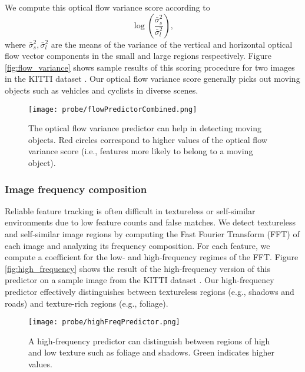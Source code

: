 We compute this optical flow variance score according to
\begin{equation}
    \log \left( \frac{\bar{\sigma}^2_s}{\bar{\sigma}^2_l} \right),
\end{equation}
where $\bar{\sigma}^2_s, \bar{\sigma}^2_l$ are the means of the variance of the vertical and horizontal optical flow vector components in the small and large regions respectively.
Figure \ref{fig:flow_variance} shows sample results of this scoring procedure for two images in the KITTI dataset \cite{Geiger:2013kp}.
Our optical flow variance score generally picks out moving objects such as vehicles and cyclists in diverse scenes.

\begin{figure}
    \centering
    \texttt{[image: probe/flowPredictorCombined.png]}
    \caption{The optical flow variance predictor can help in detecting moving objects. Red circles correspond to higher values of the optical flow variance score (i.e., features more likely to belong to a moving object).}
    \label{fig:probe_flow_variance}
\end{figure}

\subsubsection{Image frequency composition}
Reliable feature tracking is often difficult in textureless or self-similar environments due to low feature counts and false matches.
We detect textureless and self-similar image regions by computing the Fast Fourier Transform (FFT) of each image and analyzing its frequency composition.
For each feature, we compute a coefficient for the low- and high-frequency regimes of the FFT.
Figure \ref{fig:high_frequency} shows the result of the high-frequency version of this predictor on a sample image from the KITTI dataset \cite{Geiger:2013kp}.
Our high-frequency predictor effectively distinguishes between textureless regions (e.g., shadows and roads) and texture-rich regions (e.g., foliage).

\begin{figure}
    \centering
    \texttt{[image: probe/highFreqPredictor.png]}
    \caption{A high-frequency predictor can distinguish between regions of high and low texture such as foliage and shadows. Green indicates higher values.}
    \label{fig:probe_high_frequency}
\end{figure}

